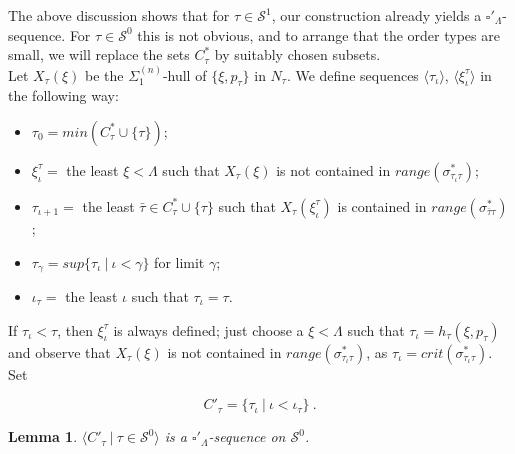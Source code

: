 \documentclass[12pt]{article}
\newtheorem{lem}[thm]{Lemma}
\begin{document}
The above discussion shows that for $\tau \in \mathcal{S}^1$, our construction already yields a $\square'_{\Lambda}$-sequence.  For $\tau \in \mathcal{S}^0$ this is not obvious, and to arrange that the order types are small, we will replace the sets $C_\tau^*$ by suitably chosen subsets.\\


Let $X_\tau (\xi)$ be the $\Sigma_1^{(n)}$-hull of $\{ \xi , p_\tau \}$ in $N_\tau$.  We define sequences $\langle \tau_\iota \rangle $, $\langle \xi_\iota^\tau \rangle$ in the following way:\\

\begin{itemize}
\item{$\tau_0 = min ( C_\tau^* \cup \{ \tau \} )$;}
\item{$\xi_\iota^\tau = $ the least $\xi < \Lambda$ such that $X_\tau (\xi)$ is not contained in $range( \sigma_{\tau_\iota \tau }^* )$;}
\item{$\tau_{\iota + 1} = $ the least $\bar{\tau} \in C_\tau^*  \cup  \{ \tau \}$ such that $X_\tau ( \xi_\iota^\tau )$ is contained in $range ( \sigma_{\bar{\tau} \tau}^*)$;}
\item{$\tau_\gamma = sup \{ \tau_\iota \ | \ \iota < \gamma \}$ for limit $\gamma$;}
\item{$\iota_\tau =$ the least $\iota$ such that $\tau_\iota = \tau$.}
\end{itemize}

If $\tau_\iota < \tau$, then $\xi_\iota^\tau$ is always defined; just choose a $\xi < \Lambda$ such that $\tau_\iota = h_\tau ( \xi , p_\tau )$ and observe that $X_\tau (\xi)$ is not contained in $range(\sigma_{\tau_\iota \tau }^*)$, as $\tau_\iota = crit(\sigma_{\tau_\iota \tau }^*)$.  Set

\[
C'_\tau = \{ \tau_\iota \ | \ \iota < \iota_\tau \} \ .
\]

\begin{lem}
$\langle C'_\tau \ | \ \tau \in \mathcal{S}^0 \rangle$ is a $\square'_\Lambda$-sequence on $\mathcal{S}^0$.
\end{lem}
\end{document}
